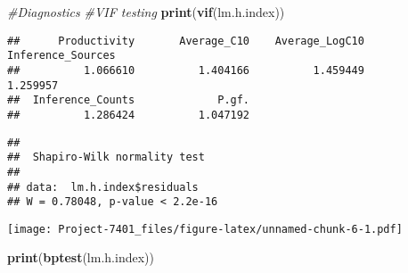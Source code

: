 \documentclass[
]{article}
\newenvironment{Shaded}{\begin{snugshade}}{\end{snugshade}}
\newcommand{\CommentTok}[1]{\textcolor[rgb]{0.56,0.35,0.01}{\textit{#1}}}
\newcommand{\FunctionTok}[1]{\textcolor[rgb]{0.13,0.29,0.53}{\textbf{#1}}}
\newcommand{\NormalTok}[1]{#1}
\newcommand{\SpecialCharTok}[1]{\textcolor[rgb]{0.81,0.36,0.00}{\textbf{#1}}}
\begin{document}
\begin{Shaded}
\begin{Highlighting}[]
\CommentTok{\#Diagnostics}
\CommentTok{\#VIF testing}
\FunctionTok{print}\NormalTok{(}\FunctionTok{vif}\NormalTok{(lm.h.index))}
\end{Highlighting}
\end{Shaded}

\begin{verbatim}
##      Productivity       Average_C10    Average_LogC10 Inference_Sources 
##          1.066610          1.404166          1.459449          1.259957 
##  Inference_Counts             P.gf. 
##          1.286424          1.047192
\end{verbatim}

\begin{Shaded}
\end{Shaded}

\begin{verbatim}
## 
##  Shapiro-Wilk normality test
## 
## data:  lm.h.index$residuals
## W = 0.78048, p-value < 2.2e-16
\end{verbatim}

\begin{Shaded}
\end{Shaded}

\texttt{[image: Project-7401\_files/figure-latex/unnamed-chunk-6-1.pdf]}

\begin{Shaded}
\begin{Highlighting}[]
\FunctionTok{print}\NormalTok{(}\FunctionTok{bptest}\NormalTok{(lm.h.index))}
\end{Highlighting}
\end{Shaded}
\end{document}
